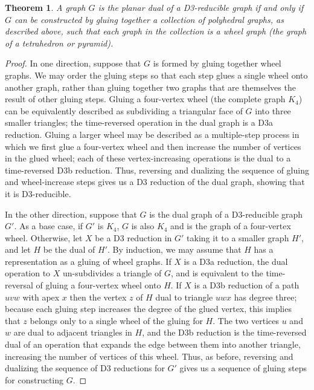 \documentclass{article}
\newtheorem{theorem}{Theorem}
\begin{document}
\begin{theorem}
\label{thm:glue}
A graph $G$ is the planar dual of a D3-reducible graph if and only if $G$ can be constructed by gluing together a collection of polyhedral graphs, as described above, such that each graph in the collection is a wheel graph (the graph of a tetrahedron or pyramid).
\end{theorem}

\begin{proof}
In one direction, suppose that $G$ is formed by gluing together wheel graphs. We may order the gluing steps so that each step glues a single wheel onto another graph, rather than gluing together two graphs that are themselves the result of other gluing steps. Gluing a four-vertex wheel (the complete graph $K_4$) can be equivalently described as subdividing a triangular face of $G$ into three smaller triangles; the time-reversed operation in the dual graph is a D3a reduction. Gluing a larger wheel may be described as a multiple-step process in which we first glue a four-vertex wheel and then increase the number of vertices in the glued wheel; each of these vertex-increasing operations is the dual to a time-reversed D3b reduction. Thus, reversing and dualizing the sequence of gluing and wheel-increase steps gives us a D3 reduction of the dual graph, showing that it is D3-reducible.

In the other direction, suppose that $G$ is the dual graph of a D3-reducible graph $G'$. As a base case, if $G'$ is $K_4$, $G$ is also $K_4$ and is the graph of a four-vertex wheel. Otherwise, let $X$ be a D3 reduction in $G'$ taking it to a smaller graph $H'$, and let $H$ be the dual of $H'$. By induction, we may assume that $H$ has a representation as a gluing of wheel graphs. If $X$ is a D3a reduction, the dual operation to $X$ un-subdivides a triangle of $G$, and is equivalent to the time-reversal of gluing a four-vertex wheel onto $H$. If $X$ is a D3b reduction of a path $uvw$ with apex $x$ then the vertex $z$ of $H$ dual to triangle $uwx$ has degree three; because each gluing step increases the degree of the glued vertex, this implies that $z$ belongs only to a single wheel of the gluing for $H$. The two vertices $u$ and $w$ are dual to adjacent triangles in $H$, and the D3b reduction is the time-reversed dual of an operation that expands the edge between them into another triangle, increasing the number of vertices of this wheel. Thus, as before, reversing and dualizing the sequence of D3 reductions for $G'$ gives us a sequence of gluing steps for constructing $G$.
\end{proof}
\end{document}
